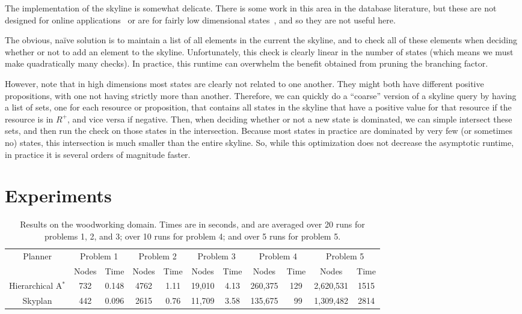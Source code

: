 \documentclass[letterpaper]{article}
\theoremstyle{plain} \newtheorem{theorem}{Theorem} \newtheorem{proposition}{Proposition} \newtheorem{lemma}{Lemma}
\theoremstyle{definition} \newtheorem{definition}{Definition} \newtheorem{conjecture}{Conjecture} \newtheorem*{example}{Example}
\theoremstyle{remark} \newtheorem*{remark}{Remark} \newtheorem*{note}{Note} \newtheorem{case}{Case}
\newcommand{\Astar}{A$^*$}
\begin{document}
The implementation of the skyline is somewhat delicate.  There
is some work in this area in the database literature, but these are
not designed for online applications~\citep{skylineoperator,tan01efficient}
or are for fairly low dimensional states~\citep{KossmannRR02}, and
so they are not useful here.

The obvious, na\"ive solution is to maintain a list of all elements
in the current the skyline, and to check all of these elements when
deciding whether or not to add an element to the skyline. Unfortunately,
this check is clearly linear in the number of states (which means
we must make quadratically many checks). In practice, this
runtime can overwhelm the benefit obtained from pruning the branching factor.

However, note that in high dimensions most states are clearly not
related to one another.  They might both have different positive
propositions, with one not having strictly more than another.
Therefore, we can quickly do a ``coarse'' version of a skyline query
by having a list of sets, one for each resource or proposition,
that contains all states in the skyline that have a positive value
for that resource if the resource is in $R^+$, and
vice versa if negative. Then, when deciding whether or not a new
state is dominated, we can simple intersect these sets, and then
run the check on those states in the intersection. Because most
states in practice are dominated by very few (or sometimes no)
states, this intersection is much smaller than the entire skyline.
So, while this optimization does not decrease the asymptotic runtime,
in practice it is several orders of magnitude faster.



\section{Experiments}


\begin{table}
	\begin{center}
		\begin{tabular}{|c|cc|cc|cc|cc|cc|}
		\hline
		\multirow{2}{*}{Planner} & \multicolumn{2}{c|}{Problem 1}  & \multicolumn{2}{c|}{Problem 2} & \multicolumn{2}{c|}{Problem 3} & \multicolumn{2}{c|}{Problem 4} & \multicolumn{2}{c|}{Problem 5} \\
		& Nodes & Time & Nodes & Time & Nodes & Time & Nodes & Time & Nodes & Time \\
		\hline
		Hierarchical \Astar & 732 & 0.148 & 4762 & 1.11 & 19,010 & 4.13 & 260,375 & 129 & 2,620,531 & 1515 \\
		Skyplan         & 442 & 0.096 & 2615 & 0.76 & 11,709 & 3.58 & 135,675 & ~99 & 1,309,482 & 2814 \\
		\hline
		\end{tabular}
	\end{center}
	\caption{Results on the woodworking domain. Times are in seconds, and are averaged over 20 runs for problems 1, 2, and 3; over 10 runs for problem 4; and over 5 runs for problem 5.}
	\label{tab:woodworking}
\end{table}
\end{document}
